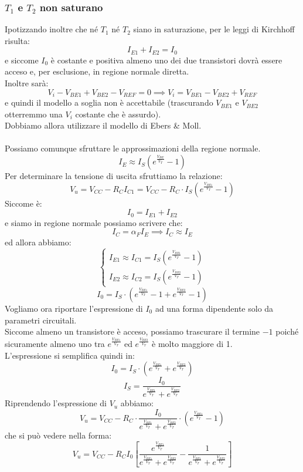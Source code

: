 \documentclass[../main.tex]{subfiles}
\begin{document}
	\subsubsection{$T_1$ e $T_2$ non saturano}
	Ipotizzando inoltre che né $T_1$ né $T_2$ siano in saturazione, per le leggi di Kirchhoff risulta:
	\[ I_{E1} + I_{E2} = I_0 \]
	e siccome $I_0$ è costante e positiva almeno uno dei due transistori dovrà essere acceso e, per esclusione, in regione normale diretta.\\
	Inoltre sarà:
	\[ V_i - V_{BE1} + V_{BE2} - V_{REF} = 0 \implies V_i = V_{BE1} - V_{BE2} + V_{REF} \]
	e quindi il modello a soglia non è accettabile (trascurando $V_{BE1}$ e $V_{BE2}$ otterremmo una $V_i$ costante che è assurdo).\\
	Dobbiamo allora utilizzare il modello di Ebers \& Moll.\\\\
	Possiamo comunque sfruttare le approssimazioni della regione normale.
	\[ I_E \approx I_S \left( e^{\frac{V_{BE}}{V_T}} - 1 \right) \]
	Per determinare la tensione di uscita sfruttiamo la relazione:
	\[ V_u = V_{CC} - R_C I_{C1} = V_{CC} - R_C \cdot I_S \left( e^{\frac{V_{BE1}}{V_T}} - 1 \right) \]
	Siccome è:
	\[ I_0 = I_{E1} + I_{E2} \]
	e siamo in regione normale possiamo scrivere che:
	\[ I_C = \alpha_F I_E \implies I_C \approx I_E \]
	ed allora abbiamo:
	\[ \begin{cases} I_{E1} \approx I_{C1} = I_S \left( e^{\frac{V_{BE1}}{V_T}} - 1 \right) \\ I_{E2} \approx I_{C2} = I_S \left( e^{\frac{V_{BE2}}{V_T}} - 1 \right) \end{cases} \]
	\[I_0 = I_S \cdot \left( e^{\frac{V_{BE1}}{V_T}} - 1 + e^{\frac{V_{BE2}}{V_T}} - 1 \right)\]
	Vogliamo ora riportare l'espressione di $I_0$ ad una forma dipendente solo da parametri circuitali.\\
	Siccome almeno un transistore è acceso, possiamo trascurare il termine $-1$ poiché sicuramente almeno uno tra $e^{\frac{V_{BE1}}{V_T}}$ ed $e^{\frac{V_{BE2}}{V_T}}$ è molto maggiore di 1.\\
	L'espressione si semplifica quindi in:
	\[ I_0 = I_S \cdot \left( e^{\frac{V_{BE1}}{V_T}} + e^{\frac{V_{BE2}}{V_T}} \right) \]
	\[I_S = \frac{I_0}{e^{\frac{V_{BE1}}{V_T}} + e^{\frac{V_{BE2}}{V_T}}}\]
	Riprendendo l'espressione di $V_u$ abbiamo:
	\[ V_u = V_{CC} - R_C \cdot \frac{I_0}{e^{\frac{V_{BE1}}{V_T}} + e^{\frac{V_{BE2}}{V_T}}} \cdot \left( e^{\frac{V_{BE1}}{V_T}} - 1 \right) \]
	che si può vedere nella forma:
	\[ V_u = V_{CC} - R_C I_0 \left[ \frac{e^{\frac{V_{BE1}}{V_T}}}{e^{\frac{V_{BE1}}{V_T}} + e^{\frac{V_{BE2}}{V_T}}} - \frac{1}{e^{\frac{V_{BE1}}{V_T}} + e^{\frac{V_{BE2}}{V_T}}} \right] \]
\end{document}
